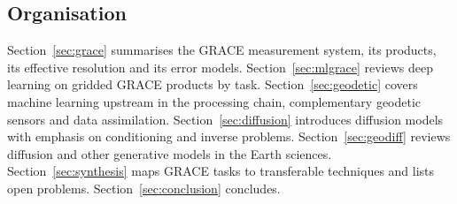 \subsection{Organisation}

Section~\ref{sec:grace} summarises the GRACE measurement system, its products, its effective resolution and its error models. Section~\ref{sec:mlgrace} reviews deep learning on gridded GRACE products by task. Section~\ref{sec:geodetic} covers machine learning upstream in the processing chain, complementary geodetic sensors and data assimilation. Section~\ref{sec:diffusion} introduces diffusion models with emphasis on conditioning and inverse problems. Section~\ref{sec:geodiff} reviews diffusion and other generative models in the Earth sciences. Section~\ref{sec:synthesis} maps GRACE tasks to transferable techniques and lists open problems. Section~\ref{sec:conclusion} concludes.
